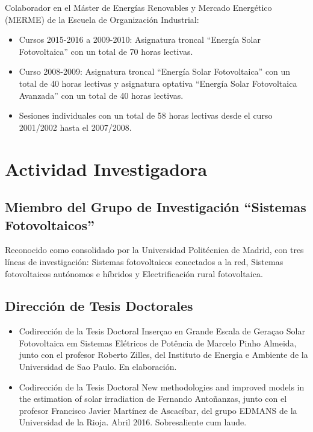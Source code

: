\documentclass[article, a4paper]{memoir}
\begin{document}
Colaborador en el Máster de Energías Renovables y Mercado Energético (MERME) de la Escuela de Organización Industrial:

\begin{itemize}
\item Cursos 2015-2016 a 2009-2010: Asignatura troncal ``Energía Solar Fotovoltaica'' con un total de 70 horas lectivas.

\item Curso 2008-2009: Asignatura troncal ``Energía Solar Fotovoltaica'' con un total de 40 horas lectivas y asignatura optativa ``Energía Solar Fotovoltaica Avanzada'' con un total de 40 horas lectivas.

\item Sesiones individuales con un total de 58 horas lectivas desde el curso 2001/2002 hasta el 2007/2008.
\end{itemize}


\section{Actividad Investigadora}
\label{sec:org3604fa0}

\subsection{Miembro del Grupo de Investigación ``Sistemas Fotovoltaicos''}
\label{sec:org1367eff}

Reconocido como consolidado por la Universidad Politécnica de Madrid, con tres líneas de investigación: Sistemas fotovoltaicos conectados a la red, Sistemas fotovoltaicos autónomos e híbridos y Electrificación rural fotovoltaica.

\subsection{Dirección de Tesis Doctorales}
\label{sec:orge388b39}

\begin{itemize}
\item Codirección de la Tesis Doctoral \guillemotleft{}Inserçao en Grande Escala de Geraçao Solar Fotovoltaica em Sistemas Elétricos de Potência\guillemotright{} de Marcelo Pinho Almeida, junto con el profesor Roberto Zilles, del Instituto de Energia e Ambiente de la Universidad de Sao Paulo. En elaboración.

\item Codirección de la Tesis Doctoral \guillemotleft{}New methodologies and improved models in the estimation of solar irradiation\guillemotright{} de Fernando Antoñanzas, junto con el profesor Francisco Javier Martínez de Ascacíbar, del grupo EDMANS de la Universidad de la Rioja. Abril 2016. Sobresaliente cum laude.
\end{itemize}
\end{document}
